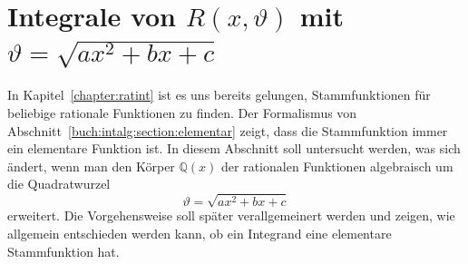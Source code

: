 %
%
%
\section{Integrale von $R(x,\vartheta)$ mit $\vartheta=\!\sqrt{ax^2+bx+c}$
\label{buch:intalg:section:wurzel}}
In Kapitel~\ref{chapter:ratint} ist es uns bereits gelungen, Stammfunktionen
für beliebige rationale Funktionen zu finden.
Der Formalismus von Abschnitt~\ref{buch:intalg:section:elementar} zeigt,
dass die Stammfunktion immer ein elementare Funktion ist.
In diesem Abschnitt soll untersucht werden, was sich ändert, wenn man den
Körper $\mathbb{Q}(x)$ der rationalen Funktionen algebraisch um die
Quadratwurzel 
\[
\vartheta = \!\sqrt{ax^2+bx+c}
\]
erweitert.
Die Vorgehensweise soll später verallgemeinert werden und zeigen, wie
allgemein entschieden werden kann, ob ein Integrand eine elementare
Stammfunktion hat.









